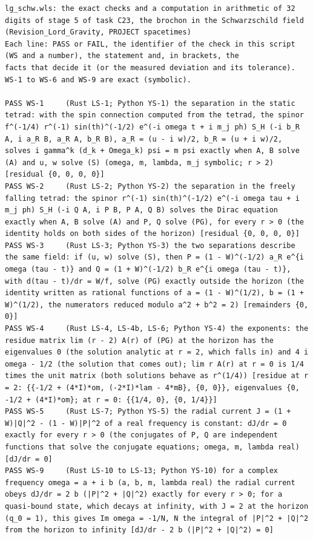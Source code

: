 \documentclass[
  10pt,
]{article}
\begin{document}
\begin{verbatim}
lg_schw.wls: the exact checks and a computation in arithmetic of 32 digits of stage 5 of task C23, the brochon in the Schwarzschild field (Revision_Lord_Gravity, PROJECT spacetimes)
Each line: PASS or FAIL, the identifier of the check in this script (WS and a number), the statement and, in brackets, the
facts that decide it (or the measured deviation and its tolerance).  WS-1 to WS-6 and WS-9 are exact (symbolic).

PASS WS-1     (Rust LS-1; Python YS-1) the separation in the static tetrad: with the spin connection computed from the tetrad, the spinor f^(-1/4) r^(-1) sin(th)^(-1/2) e^(-i omega t + i m_j ph) S_H (-i b_R A, i a_R B, a_R A, b_R B), a_R = (u - i w)/2, b_R = (u + i w)/2, solves i gamma^k (d_k + Omega_k) psi = m psi exactly when A, B solve (A) and u, w solve (S) (omega, m, lambda, m_j symbolic; r > 2) [residual {0, 0, 0, 0}]
PASS WS-2     (Rust LS-2; Python YS-2) the separation in the freely falling tetrad: the spinor r^(-1) sin(th)^(-1/2) e^(-i omega tau + i m_j ph) S_H (-i Q A, i P B, P A, Q B) solves the Dirac equation exactly when A, B solve (A) and P, Q solve (PG), for every r > 0 (the identity holds on both sides of the horizon) [residual {0, 0, 0, 0}]
PASS WS-3     (Rust LS-3; Python YS-3) the two separations describe the same field: if (u, w) solve (S), then P = (1 - W)^(-1/2) a_R e^{i omega (tau - t)} and Q = (1 + W)^(-1/2) b_R e^{i omega (tau - t)}, with d(tau - t)/dr = W/f, solve (PG) exactly outside the horizon (the identity written as rational functions of a = (1 - W)^(1/2), b = (1 + W)^(1/2), the numerators reduced modulo a^2 + b^2 = 2) [remainders {0, 0}]
PASS WS-4     (Rust LS-4, LS-4b, LS-6; Python YS-4) the exponents: the residue matrix lim (r - 2) A(r) of (PG) at the horizon has the eigenvalues 0 (the solution analytic at r = 2, which falls in) and 4 i omega - 1/2 (the solution that comes out); lim r A(r) at r = 0 is 1/4 times the unit matrix (both solutions behave as r^(1/4)) [residue at r = 2: {{-1/2 + (4*I)*om, (-2*I)*lam - 4*mB}, {0, 0}}, eigenvalues {0, -1/2 + (4*I)*om}; at r = 0: {{1/4, 0}, {0, 1/4}}]
PASS WS-5     (Rust LS-7; Python YS-5) the radial current J = (1 + W)|Q|^2 - (1 - W)|P|^2 of a real frequency is constant: dJ/dr = 0 exactly for every r > 0 (the conjugates of P, Q are independent functions that solve the conjugate equations; omega, m, lambda real) [dJ/dr = 0]
PASS WS-9     (Rust LS-10 to LS-13; Python YS-10) for a complex frequency omega = a + i b (a, b, m, lambda real) the radial current obeys dJ/dr = 2 b (|P|^2 + |Q|^2) exactly for every r > 0; for a quasi-bound state, which decays at infinity, with J = 2 at the horizon (q_0 = 1), this gives Im omega = -1/N, N the integral of |P|^2 + |Q|^2 from the horizon to infinity [dJ/dr - 2 b (|P|^2 + |Q|^2) = 0]

\end{verbatim}
\end{document}
